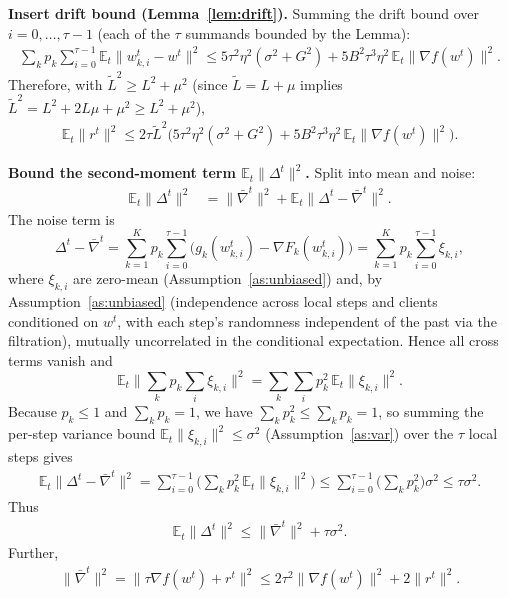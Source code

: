 \documentclass{article}
\begin{document}
\textbf{Insert drift bound (Lemma~\ref{lem:drift}).} Summing the drift bound over $i=0,\dots,\tau-1$ (each of the $\tau$ summands bounded by the Lemma):
\begin{align}
\sum_k p_k\sum_{i=0}^{\tau-1}\mathbb{E}_t\|w_{k,i}^t-w^t\|^2
\le 5\tau^2\eta^2(\sigma^2+G^2) + 5B^2\tau^3\eta^2 \,\mathbb{E}_t\|\nabla f(w^t)\|^2 .
\tag{Step 9}
\end{align}
Therefore, with $\tilde L^2 \ge L^2 + \mu^2$ (since $\tilde L = L+\mu$ implies $\tilde L^2 = L^2+2L\mu+\mu^2 \ge L^2+\mu^2$),
\begin{align}
\mathbb{E}_t\|r^t\|^2
\le 2\tau \tilde L^2\Big(5\tau^2\eta^2(\sigma^2+G^2) + 5B^2\tau^3\eta^2\,\mathbb{E}_t\|\nabla f(w^t)\|^2\Big).
\tag{Step 10}
\end{align}

\textbf{Bound the second-moment term $\mathbb{E}_t\|\Delta^t\|^2$.} Split into mean and noise:
\begin{align}
\mathbb{E}_t\|\Delta^t\|^2
&= \|\bar\nabla^t\|^2 + \mathbb{E}_t\|\Delta^t - \bar\nabla^t\|^2 .
\tag{Step 11a}
\end{align}
The noise term is
\[
\Delta^t - \bar\nabla^t = \sum_{k=1}^K p_k \sum_{i=0}^{\tau-1}\big(g_k(w_{k,i}^t)-\nabla F_k(w_{k,i}^t)\big)
= \sum_{k=1}^K p_k \sum_{i=0}^{\tau-1}\xi_{k,i},
\]
where $\xi_{k,i}$ are zero-mean (Assumption~\ref{as:unbiased}) and, by Assumption~\ref{as:unbiased} (independence across local steps and clients conditioned on $w^t$, with each step's randomness independent of the past via the filtration), mutually uncorrelated in the conditional expectation. Hence all cross terms vanish and
\[
\mathbb{E}_t\Big\|\sum_{k}p_k\sum_i \xi_{k,i}\Big\|^2
= \sum_{k}\sum_i p_k^2\,\mathbb{E}_t\|\xi_{k,i}\|^2 .
\]
Because $p_k \le 1$ and $\sum_k p_k = 1$, we have $\sum_k p_k^2 \le \sum_k p_k = 1$, so summing the per-step variance bound $\mathbb{E}_t\|\xi_{k,i}\|^2 \le \sigma^2$ (Assumption~\ref{as:var}) over the $\tau$ local steps gives
\begin{align}
\mathbb{E}_t\|\Delta^t - \bar\nabla^t\|^2
= \sum_{i=0}^{\tau-1}\Big(\sum_{k}p_k^2\,\mathbb{E}_t\|\xi_{k,i}\|^2\Big)
\le \sum_{i=0}^{\tau-1} \Big(\sum_k p_k^2\Big)\sigma^2
\le \tau\sigma^2 .
\tag{Step 11b}
\end{align}
Thus
\begin{align}
\mathbb{E}_t\|\Delta^t\|^2 \le \|\bar\nabla^t\|^2 + \tau\sigma^2 .
\tag{Step 11}
\end{align}
Further,
\begin{align}
\|\bar\nabla^t\|^2 = \|\tau\nabla f(w^t)+r^t\|^2 \le 2\tau^2\|\nabla f(w^t)\|^2 + 2\|r^t\|^2 .
\tag{Step 12}
\end{align}
\end{document}
